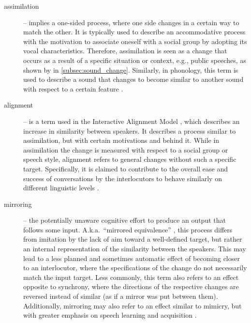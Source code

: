 \begin{description}
	\item[assimilation] -- implies a one-sided process, where one side changes in a certain way to match the other.
	It is typically used to describe an accommodative process with the motivation to associate oneself with a social group by adopting its vocal characteristics.
	Therefore, assimilation is seen as a change that occurs as a result of a specific situation or context, e.g., public speeches, as shown by \citet{Ohala1990phonetics} in \cref{subsec:sound_change}.
	Similarly, in phonology, this term is used to describe a sound that changes to become similar to another sound with respect to a certain feature \citep[see examples in][pp.~89-98]{Hall2011phonologie}.
	
	\item[alignment] -- is a term used in the Interactive Alignment Model \citep{Pickering2004behavioral}, which describes an increase in similarity between speakers.
	It describes a process similar to assimilation, but with certain motivations and behind it.
	While in assimilation the change is measured with respect to a social group or speech style, alignment refers to general changes without such a specific target.
	Specifically, it is claimed to contribute to the overall ease and success of conversations by the interlocutors to behave similarly on different linguistic levels \citep{Garrod2009joint}.
	
	\item[mirroring] -- the potentially unaware cognitive effort to produce an output that follows some input.
	A.k.a.\ \enquote{mirrored equivalence} \citep{Messum2015creating, Messum2007mirroring}, this process differs from imitation by the lack of aim toward a well-defined target, but rather an internal representation of the similarity between the speakers.
	This may lead to a less planned and sometimes automatic effect of becoming closer to an interlocutor, where the specifications of the change do not necessarily match the input target.
	Less commonly, this term also refers to an effect opposite to synchrony, where the directions of the respective changes are reversed instead of similar (as if a mirror was put between them).
	Additionally, mirroring may also refer to an effect similar to mimicry, but with greater emphasis on speech learning and acquisition \citep[e.g.,][]{Yoshikawa2003constructivist}.
	

\end{description}
